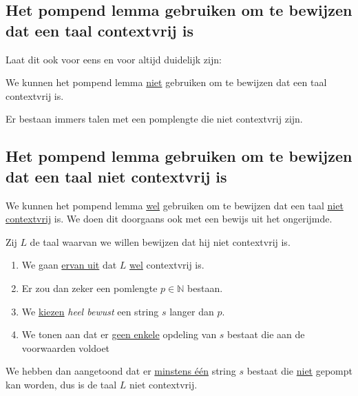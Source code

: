 \documentclass[main.tex]{subfiles}
\begin{document}
\subsection{Het pompend lemma gebruiken om te bewijzen dat een taal contextvrij is}
Laat dit ook voor eens en voor altijd duidelijk zijn:
\begin{center}
  We kunnen het pompend lemma \underline{niet} gebruiken om te bewijzen dat een taal contextvrij is.
\end{center}
Er bestaan immers talen met een pomplengte die niet contextvrij zijn.

\subsection{Het pompend lemma gebruiken om te bewijzen dat een taal niet contextvrij is}
We kunnen het pompend lemma \underline{wel} gebruiken om te bewijzen dat een taal \underline{niet contextvrij} is.
We doen dit doorgaans ook met een bewijs uit het ongerijmde.

Zij $L$ de taal waarvan we willen bewijzen dat hij niet contextvrij is.
\begin{enumerate}
\item We gaan \underline{ervan uit} dat $L$ \underline{wel} contextvrij is.
\item Er zou dan zeker een pomlengte $p\in \mathbb{N}$ bestaan.
\item We \underline{kiezen} \emph{heel bewust} een string $s$ langer dan $p$.
\item We tonen aan dat er \underline{geen enkele} opdeling van $s$ bestaat die aan de voorwaarden voldoet
\end{enumerate}
We hebben dan aangetoond dat er \underline{minstens \'e\'en} string $s$ bestaat die \underline{niet} gepompt kan worden, dus is de taal $L$ niet contextvrij.
\end{document}
